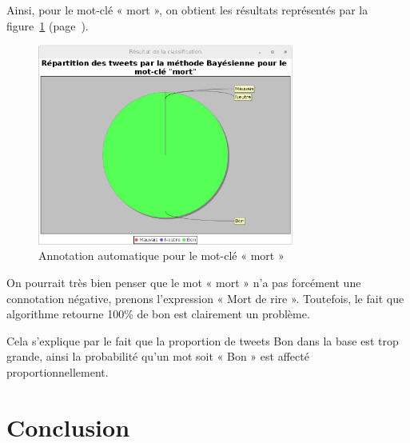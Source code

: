 \documentclass[12pt,a4paper]{report}
\begin{document}
Ainsi, pour le mot-clé « mort », on obtient les résultats représentés par la
figure~\ref{capture_classification_mort_tweetsv7}
(page~\pageref{capture_classification_mort_tweetsv7}).

\begin{figure}
	\centering
	\includegraphics[width=0.75\textwidth]{img/bayes_annotation_mort_tweetsv7.eps}
	\caption{Annotation automatique pour le mot-clé « mort »}
	\label{capture_classification_mort_tweetsv7}
\end{figure}

On pourrait très bien penser que le mot « mort » n'a pas forcément une
connotation négative, prenons l'expression « Mort de rire ». Toutefois, le fait
que algorithme retourne 100\% de bon est clairement un problème.

Cela s'explique par le fait que la proportion de tweets Bon dans la base est
trop grande, ainsi la probabilité qu'un mot soit « Bon » est affecté
proportionnellement.


\chapter{Conclusion}
\end{document}
